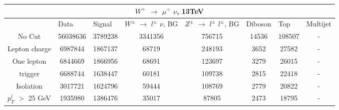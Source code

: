 \documentclass[10pt]{article}
\begin{document}
 										
\begin{center}										
\begin{table}[H] 										
\begin{adjustbox}{width=1\textwidth}								
\begin{tabular}{cccccccc} 									
\\ \hline \hline  										
\multicolumn{8}{c}{$W^{+}$ $\rightarrow$ $\mu^{+}$ $\nu$, 13TeV}  									
\\ \hline \hline                            						
\multicolumn{1}{|c|}{}   & \multicolumn{1}{l|}{Data} & \multicolumn{1}{l|}{Signal} & \multicolumn{1}{l|}{$W^{\pm}$ $\rightarrow$ $l^{\pm}$ $\nu$, BG} & \multicolumn{1}{l|}{$Z^{\pm}$ $\rightarrow$ $l^{\pm}$ $l^{\pm}$, BG} & \multicolumn{1}{l|}{Diboson} & \multicolumn{1}{l|}{Top} & \multicolumn{1}{l|}{Multijet} \\ \hline 
\multicolumn{1}{|c|}{No Cut}  & \multicolumn{1}{c|}{56038636} & \multicolumn{1}{c|}{3789238} & \multicolumn{1}{c|}{3341356} & \multicolumn{1}{c|}{756715} & \multicolumn{1}{c|}{14536} & \multicolumn{1}{c|}{108507} & \multicolumn{1}{c|}{-}  \\ \hline 
\multicolumn{1}{|c|}{Lepton charge}  & \multicolumn{1}{c|}{6987844} & \multicolumn{1}{c|}{1867137} & \multicolumn{1}{c|}{68719} & \multicolumn{1}{c|}{248193} & \multicolumn{1}{c|}{3652} & \multicolumn{1}{c|}{27582} & \multicolumn{1}{c|}{-}  \\ \hline 
\multicolumn{1}{|c|}{One lepton}  & \multicolumn{1}{c|}{6844669} & \multicolumn{1}{c|}{1866956} & \multicolumn{1}{c|}{68691} & \multicolumn{1}{c|}{123697} & \multicolumn{1}{c|}{3279} & \multicolumn{1}{c|}{26015} & \multicolumn{1}{c|}{-}  \\ \hline 
\multicolumn{1}{|c|}{trigger}  & \multicolumn{1}{c|}{6688744} & \multicolumn{1}{c|}{1638447} & \multicolumn{1}{c|}{60181} & \multicolumn{1}{c|}{109738} & \multicolumn{1}{c|}{2815} & \multicolumn{1}{c|}{22418} & \multicolumn{1}{c|}{-}  \\ \hline 
\multicolumn{1}{|c|}{Isolation}  & \multicolumn{1}{c|}{3017721} & \multicolumn{1}{c|}{1624796} & \multicolumn{1}{c|}{59444} & \multicolumn{1}{c|}{108769} & \multicolumn{1}{c|}{2779} & \multicolumn{1}{c|}{20822} & \multicolumn{1}{c|}{-}  \\ \hline 
\multicolumn{1}{|c|}{$p_{T}^{l}$ $>$ 25 GeV}  & \multicolumn{1}{c|}{1935980} & \multicolumn{1}{c|}{1386476} & \multicolumn{1}{c|}{35017} & \multicolumn{1}{c|}{87805} & \multicolumn{1}{c|}{2473} & \multicolumn{1}{c|}{18795} & \multicolumn{1}{c|}{-}  \\ \hline 

\end{tabular}
\end{adjustbox}
\end{table}
\end{center}
\end{document}
